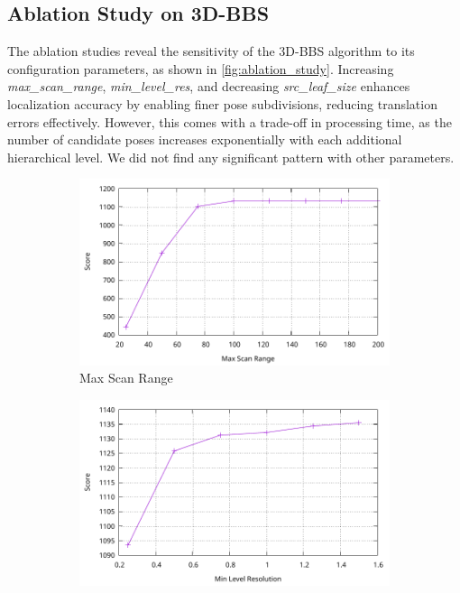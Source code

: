 \subsection{Ablation Study on 3D-BBS}
The ablation studies reveal the sensitivity of the 3D-BBS algorithm to its configuration parameters, as shown in \autoref{fig:ablation_study}. Increasing \textit{max\_scan\_range}, \textit{min\_level\_res}, and decreasing \textit{src\_leaf\_size} enhances localization accuracy by enabling finer pose subdivisions, reducing translation errors effectively. However, this comes with a trade-off in processing time, as the number of candidate poses increases exponentially with each additional hierarchical level. We did not find any significant pattern with other parameters.

\begin{figure}[t]
    \centering
    \begin{subfigure}[t]{0.32\textwidth}
        \centering
        \includegraphics[width=\textwidth]{../02-global-localization/plots/max_scan_range.pdf}
        \caption{Max Scan Range}
    \end{subfigure}
    \begin{subfigure}[t]{0.32\textwidth}
        \centering
        \includegraphics[width=\textwidth]{../02-global-localization/plots/min_level_res.pdf}

\end{subfigure}
\end{figure}
